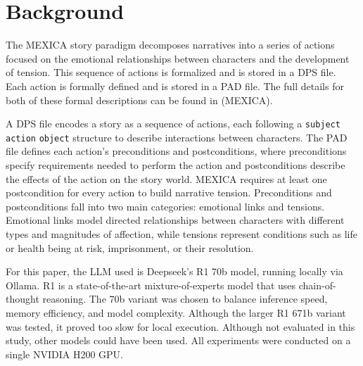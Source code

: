 \documentclass[phd,electronic,oneside,twosidetoc,letterpaper,chaptercenter,parttop,lof]{byumsphd}
\begin{document}
\section{Background}

The MEXICA story paradigm decomposes narratives into a series of actions focused on the emotional relationships between characters and the development of tension. This sequence of actions is formalized and is stored in a DPS file. Each action is formally defined and is stored in a PAD file. The full details for both of these formal descriptions can be found in (MEXICA). 

A DPS file encodes a story as a sequence of actions, each following a \texttt{subject} \texttt{action} \texttt{object} structure to describe interactions between characters. The PAD file defines each action's preconditions and postconditions, where preconditions specify requirements needed to perform the action and postconditions describe the effects of the action on the story world. MEXICA requires at least one postcondition for every action to build narrative tension. Preconditions and postconditions fall into two main categories: emotional links and tensions. Emotional links model directed relationships between characters with different types and magnitudes of affection, while tensions represent conditions such as life or health being at risk, imprisonment, or their resolution.

For this paper, the LLM used is Deepseek's R1 70b model, running locally via Ollama. R1 is a state-of-the-art mixture-of-experts model that uses chain-of-thought reasoning. The 70b variant was chosen to balance inference speed, memory efficiency, and model complexity. Although the larger R1 671b variant was tested, it proved too slow for local execution. Although not evaluated in this study, other models could have been used. All experiments were conducted on a single NVIDIA H200 GPU.
\end{document}
